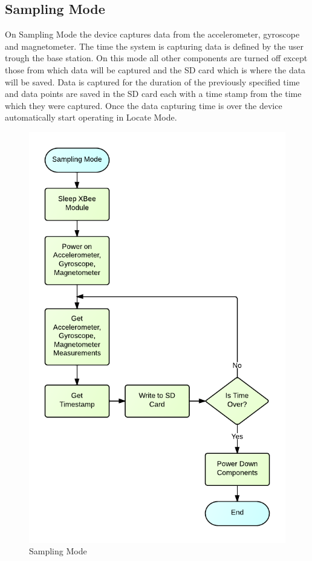 \subsection{Sampling Mode}
On Sampling Mode the device captures data from the accelerometer, gyroscope and magnetometer. The time the system is capturing data is defined by the user trough the base station. On this mode all other components are turned off except those from which data will be captured and the SD card which is where the data will be saved. Data is captured for the duration of the previously specified time and data points are saved in the SD card each with a time stamp from the time which they were captured. Once the data capturing time is over the device automatically start operating in Locate Mode.
\begin{figure}[H]
	\centering
	\includegraphics[scale=1.0]{img/SamplingMode}
	\caption{Sampling Mode \label{fig:samplingMode}}
\end{figure}

